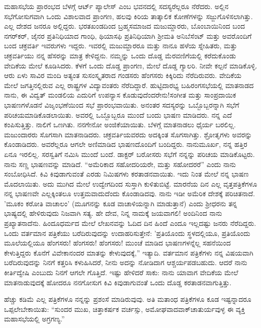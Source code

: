 ಮಹಾಸಭೆಯ ಪ್ರಾರಂಭದ ಬೆಳಗ್ಗೆ ಆರ್ಟ್ ಪ್ಯಾಲೇಸ್ ಎಂಬ ಭವನದಲ್ಲಿ ಸದಸ್ಯರೆಲ್ಲರೂ ನೆರೆದರು. ಅಲ್ಲಿನ ಸಭೆಗೋಸುಗವಾಗಿ ಒಂದು ವಿಶಾಲವಾದ ಪ್ರಾಂಗಣ, ಹಲವು ಕಿರಿಯ ತಾತ್ಕಾಲಿಕ ಕೋಣೆಗಳನ್ನು ಸಜ್ಜುಗೊಳಿಸಲಾಗಿತ್ತು. ಎಲ್ಲ ದೇಶದ ಜನರೂ ಅಲ್ಲಿದ್ದರು. ಭರತಖಂಡದಿಂದ ಬ್ರಹ್ಮಸಮಾಜದ ಮಜುಮ್ದಾರರು, ಬೊಂಬಾಯಿನಿಂದ ಬಂದ ನಗರ್‌ಕರ್‌, ಜೈನರ ಪ್ರತಿನಿಧಿಯಾದ ಗಾಂಧಿ, ಥಿಯಾಸಫಿ ಪ್ರತಿನಿಧಿಯಾಗಿ ಶ‍್ರೀಮತಿ ಅನಿಬೆಸೆಂಟ್ ಮತ್ತು ಅವರೊಂದಿಗೆ ಬಂದ ಚಕ್ರವರ್ತಿ ಇವರುಗಳು ಇದ್ದರು. ಇವರಲ್ಲಿ ಮಜುಮ್ದಾರರೂ ಮತ್ತು ನಾನೂ ಹಳೆಯ ಸ್ನೇಹಿತರು, ಮತ್ತು ಚಕ್ರವರ್ತಿಯು ನನ್ನ ಹೆಸರನ್ನು ಮಾತ್ರ ಕೇಳಿದ್ದನು. ನಮ್ಮನ್ನು ಒಂದು ದೊಡ್ಡ ಮೆರವಣಿಗೆಯಲ್ಲಿ ಕರೆದುಕೊಂಡು ವೇದಿಕೆಯ ಮೇಲೆ ಕೂಡಿಸಿದರು. ಕೆಳಗೆ ಒಂದು ದೊಡ್ಡ ಪ್ರಾಂಗಣ, ಮೇಲೆ ದೊಡ್ಡ ಗ್ಯಾಲರಿ. ನೀವೇ ಕಲ್ಪನೆ ಮಾಡಿಕೊಳ್ಳಿ. ಆರು ಏಳು ಸಾವಿರ ಮಂದಿ ಅತ್ಯಂತ ಸುಸಂಸ್ಕೃತರಾದ ಗಂಡಸರು ಹೆಂಗಸರು ಕಿಕ್ಕಿರಿದು ನೆರೆದಿರುವರು. ವೇದಿಕೆಯ ಮೇಲೆ ಜಗತ್ತಿನಲ್ಲಿರುವ ಎಲ್ಲ ರಾಷ್ಟ್ರಗಳ ವಿದ್ಯಾವಂತರು ನೆರೆದಿದ್ದಾರೆ. ಹುಟ್ಟಿದಾರಭ್ಯ ಬಹಿರಂಗಸಭೆಯಲ್ಲಿ ಮಾತನಾಡದ ನಾನು, ಈ ವಿದ್ವತ್ ಮಂಡಲಿಯ ಎದುರಿಗೆ ಉಪನ್ಯಾಸ ಕೊಡುವುದೆಂದರೇನು!ಸಂಗೀತ ಮತ್ತು ಸಾಂಪ್ರದಾಯಿಕ ಭಾಷಣಗಳೊಡನೆ ವಿಜೃಂಭಣೆಯಿಂದ ಸಭೆ ಪ್ರಾರಂಭವಾಯಿತು. ಅನಂತರ ಸದಸ್ಯರನ್ನು ಒಬ್ಬೊಬ್ಬರನ್ನಾಗಿ ಸಭೆಗೆ ಪರಿಚಯಮಾಡಿಕೊಡಲಾಯಿತು. ಅವರಲ್ಲಿ ಒಬ್ಬೊಬ್ಬರೂ ಮುಂದೆ ಬಂದು ಭಾಷಣ ಮಾಡಿದರು. ನನ್ನ ಎದೆ ಕಂಪಿಸುತ್ತಿತ್ತು. ನಾಲಿಗೆ ಒಣಗಿತು. ನನಗೇನೋ ಅಂಜಿಕೆಯಾಯಿತು. ಬೆಳಗ್ಗೆ ಮಾತನಾಡಲು ಧೈರ್ಯ ಬರಲಿಲ್ಲ. ಮಜುಂದಾರರು ಸೊಗಸಾಗಿ ಮಾತನಾಡಿದರು. ಚಕ್ರವರ್ತಿಯವರದು ಅದಕ್ಕಿಂತ ಸೊಗಸಾಗಿತ್ತು. ಶ್ರೋತೃಗಳು ಅವರನ್ನು ಕೊಂಡಾಡಿದರು. ಅವರೆಲ್ಲರೂ ಆಗಲೇ ಅಣಿಮಾಡಿದ ಭಾಷಣದೊಂದಿಗೆ ಬಂದಿದ್ದರು. ನಾನುಮೂರ್ಖ, ನನ್ನ ಹತ್ತಿರ ಏನೂ ಇರಲಿಲ್ಲ. ಸರಸ್ವತಿಗೆ ನಮಿಸಿ ಮುಂದೆ ಬಂದೆ. ಡಾಕ್ಟರ್ ಬರೋಸರು ಸಭೆಗೆ ನನ್ನನ್ನು ಪರಿಚಯ ಮಾಡಿಕೊಟ್ಟರು. ನಾನು ಸಣ್ಣ ಭಾಷಣವನ್ನು ಮಾಡಿದೆ. ``ಅಮೆರಿಕಾದ ಸಹೋದರಿಯರೇ, ಮತ್ತು ಸಹೋದರರೆ'' ಎಂದು ನಾನು ಸಂಬೋಧಿಸಿದೆ. ಕಿವಿ ಕಿವುಡಾಗುವಂತೆ ಎರಡು ನಿಮಿಷಗಳು ಕರತಾಡನವಾಯಿತು. ಇದು ನಿಂತ ಮೇಲೆ ನನ್ನ ಭಾಷಣ ಮೊದಲಾಯಿತು. ಅದು ಮುಗಿದ ಮೇಲೆ ಉದ್ವೇಗದಿಂದ ಸುಸ್ತಾಗಿ ಕುಳಿತುಬಿಟ್ಟೆ. ಮಾರನೆಯ ದಿನ ಎಲ್ಲ ವೃತ್ತಪತ್ರಿಕೆಗಳೂ ನನ್ನ ಭಾಷಣವೇ ಎಲ್ಲಕ್ಕಿಂತಲೂ ಉತ್ತಮವಾದುದೆಂದು ಕೊಂಡಾಡಿದವು. ನಾನು ಇಡೀ ಅಮೆರಿಕ ದೇಶಕ್ಕೆ ಪರಿಚಿತನಾದೆ. 'ಮೂಕಂ ಕರೋತಿ ವಾಚಾಲಂ' (ಮೂಗನನ್ನು ಕೂಡ ವಾಚಾಳಿಯನ್ನಾಗಿ ಮಾಡುತ್ತಾನೆ) ಎಂದು ಶ‍್ರೀಧರನು ತನ್ನ ಭಾಷ್ಯದಲ್ಲಿ ಹೇಳಿರುವುದು ನಿಜವಾಗಿ ಸತ್ಯ. ಹೇ ದೇವ, ನಿನ್ನ ನಾಮಕ್ಕೆ ಜಯವಾಗಲಿ! ಅಂದಿನಿಂದ ನಾನು ಪ್ರಖ್ಯಾತನಾದೆನು. ಹಿಂದೂಧರ್ಮದ ಮೇಲೆ ಲೇಖನವನ್ನು ಓದಿದ ದಿನ ಹಿಂದೆ ಎಂದೂ ಇಲ್ಲದಷ್ಟು ಜನರು ನೆರೆದಿದ್ದರು. ಒಂದು ವರ್ತಮಾನ ಪತ್ರಿಕೆಯು ಬರೆದಿರುವುದನ್ನು ಉದಾಹರಿಸುತ್ತೇನೆ: 'ಪ್ರತಿಯೊಂದು ಸ್ಥಳದಲ್ಲಿಯೂ, ಪ್ರತಿಯೊಂದು ಮೂಲೆಯಲ್ಲಿಯೂ ಹೆಂಗಸರು! ಹೆಂಗಸರು! ಹೆಂಗಸರು! ಮುಂಚೆ ಮಾಡಿದ ಭಾಷಣಗಳನ್ನೆಲ್ಲ ಸಹನೆಯಿಂದ ಕೇಳುತ್ತಿದ್ದರು \enginline{-} ಕೊನೆಗೆ ವಿವೇಕಾನಂದರ ಮಾತನ್ನು ಕೇಳುವುದಕ್ಕೆ,” ಇತ್ಯಾದಿ. ವರ್ತಮಾನ ಪತ್ರಿಕೆಗಳು ನನ್ನ ವಿಷಯವಾಗಿ ಬರೆದಿರುವುದನ್ನು ನಿನಗೆ ಕತ್ತರಿಸಿ ಕಳುಹಿಸಿದರೆ, ನೀನು ಅದನ್ನು ನೋಡಿದಾಗ ಆಶ್ಚರ್ಯಪಡಬಹುದು. ಆದರೆ ನಾನು ಕೀರ್ತಿದ್ವೇಷಿ ಎಂಬುದು ನಿನಗೆ ಆಗಲೇ ಗೊತ್ತಿದೆ. ಇಷ್ಟು ಹೇಳಿದರೆ ಸಾಕು: ನಾನು ಯಾವಾಗ ವೇದಿಕೆಯ ಮೇಲೆ ಮಾತನಾಡುವುದಕ್ಕೆ ಹೋದರೂ ನನಗೋಸುಗ ಕಿವಿ ಕಿವುಡಾಗುವಂತೆ ಒಂದು ದೊಡ್ಡ ಕರತಾಡನವಾಗುತ್ತಿತ್ತು.

ಹೆಚ್ಚು ಕಡಿಮೆ ಎಲ್ಲ ಪತ್ರಿಕೆಗಳೂ ನನ್ನನ್ನು ಪ್ರಶಂಸೆ ಮಾಡಿರುವುವು. ಅತಿ ಮತಾಂಧ ಪತ್ರಿಕೆಗಳೂ ಕೂಡ ಇಷ್ಟನ್ನಾದರೂ ಒಪ್ಪಲೇಬೇಕಾಯಿತು: “ಸುಂದರ ಮುಖ, ಚಿತ್ತಾಕರ್ಷಕ ವರ್ಚಸ್ಸು, ಅಮೋಘವಾದವಾಕ್‌ಚಾತುರ್ಯವುಳ್ಳ ಈ ವ್ಯಕ್ತಿ ಮಹಾಸಭೆಯಲ್ಲಿ ಅಗ್ರಗಣ್ಯ.”

